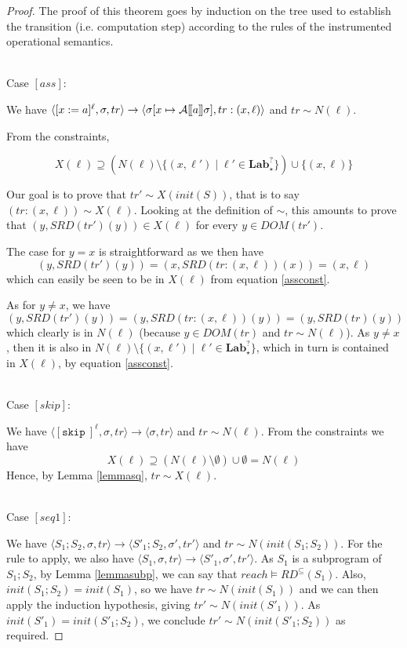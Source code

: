 \documentclass[a4wide,12pt]{article}
\theoremstyle{definition}
\theoremstyle{plain}
\theoremstyle{remark}
\def\A#1{\mathcal{A}[\hspace{-1pt}[#1]\hspace{-1pt}]}
\def\const#1{\mathopen{\langle}#1\mathclose{\rangle}} %
\def\pair#1{\const{#1}}
\def\Lab {\mathbf{Lab}}
\def\skip {\texttt{skip}\ }
\begin{document}
\begin{proof}
The proof of this theorem goes by induction on the tree used to establish
the transition (i.e. computation step) according to the rules of the instrumented operational semantics.

~\\
Case $[ass]$:

We have $\pair{[x := a]^\ell, \sigma, tr} \to \pair{\sigma[x\mapsto\A{a}\sigma], tr:(x,\ell)}$
and $tr \sim N(\ell)$. 


From the constraints,

\begin{equation}\label{assconst}
X(\ell) \supseteq (N(\ell) \setminus \{(x,\ell') \mid \ell' \in \Lab_\star^?\}) \cup \{(x,\ell)\}
\end{equation}

Our goal is to prove that $tr' \sim X(init(S))$, that is to say $(tr:(x,\ell)) \sim X(\ell)$.
Looking at the definition of $\sim$,
this amounts to prove that $(y,SRD(tr')(y)) \in X(\ell)$ for every $y \in DOM(tr')$.

The case for $y=x$ is straightforward as
we then have \[(y,SRD(tr')(y)) = (x,SRD(tr:(x,\ell))(x)) = (x,\ell)\] which can easily be seen to be in $X(\ell)$ from equation \ref{assconst}.

As for $y\neq x$, we have \[(y,SRD(tr')(y)) = (y,SRD(tr:(x,\ell))(y)) = (y,SRD(tr)(y))\] which clearly is in $N(\ell)$ (because $y \in DOM(tr)$ and $tr \sim N(\ell)$).
As $y\neq x$, then it is also in $N(\ell) \setminus \{(x,\ell') \mid \ell' \in \Lab_\star^?\}$, which in turn is contained in $X(\ell)$, by equation \ref{assconst}.

~\\
Case $[skip]$:

We have $\pair{[\skip]^\ell, \sigma, tr} \to \pair{\sigma, tr}$
and $tr \sim N(\ell)$. 
From the constraints we have
\[X(\ell) \supseteq (N(\ell) \setminus \emptyset) \cup \emptyset = N(\ell)\]
Hence, by Lemma \ref{lemmasq}, $tr \sim X(\ell)$.

~\\
Case $[seq1]$:

We have $\pair{S_1;S_2,\sigma,tr} \to \pair{S'_1;S_2,\sigma',tr'}$ and $tr \sim N(init(S_1;S_2))$.
For the rule to apply, we also have $\pair{S_1,\sigma,tr} \to \pair{S'_1,\sigma',tr'}$.
As $S_1$ is a subprogram of $S_1;S_2$, by Lemma \ref{lemmasubp},
we can say that $reach \models RD^{\subseteq}(S_1)$. Also, $init(S_1;S_2) = init(S_1)$, so we have
$tr \sim N(init(S_1))$ and we can then apply the induction hypothesis, giving $tr' \sim  N(init(S'_1))$.
As $init(S'_1) = init(S'_1;S_2)$, we conclude $tr' \sim N(init(S'_1;S_2))$ as required.


\end{proof}
\end{document}

